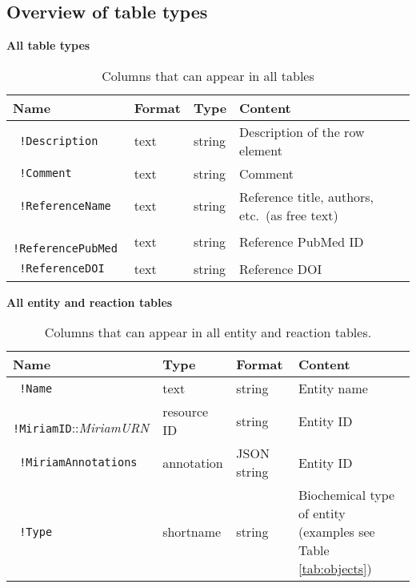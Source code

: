 \documentclass[a4paper]{article}
\newcommand{\coout}[1]{}
\newcommand{\col}[1]{\texttt{\color{blue} #1}}
\begin{document}
\begin{appendix}

\section{Overview of table types}
\label{appendixA}

\coout{add SBMLSpeciesID wherever needed}
\coout{mark columns as * mandatory x recommended o optional . none}

\begin{table}[h!]
\textbf{All table types}\\
\begin{tabular}{|l|l|l|l|}
\hline 
Name & Format & Type & Content \\
\hline
  \col{!Description}    & text & string & Description of the row element\\
  \col{!Comment}        & text & string & Comment\\
  \col{!ReferenceName}  & text & string & Reference title, authors, etc.~(as free text)\\
  \col{!ReferencePubMed}& text & string & Reference PubMed ID\\
  \col{!ReferenceDOI}   & text & string & Reference DOI\\
  \hline 
\end{tabular}
\caption{Columns that can appear in all tables}
\label{tab:columnsalltables}
\end{table}

\begin{table}[h!]
{\small\textbf{All entity and reaction tables} \\
\begin{tabular}{|l|l|l|l|}
\hline
Name & Type & Format & Content \\
\hline
  \col{!Name}       				& text 			& string 	& Entity name \\
  \col{!MiriamID}::\emph{MiriamURN} & resource ID 	& string	& Entity ID \\
  \col{!MiriamAnnotations} 			& annotation 	& JSON string 	& Entity ID \\
  \col{!Type}					 	& shortname 	& string	& Biochemical type of entity (examples see Table \ref{tab:objects})\\
\hline
\end{tabular}
\caption{Columns that can appear in all entity and reaction tables.}
\label{tab:columnsalltables}
}
\end{table}


\end{appendix}
\end{document}
